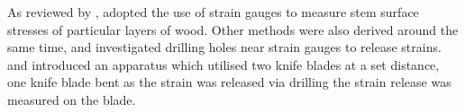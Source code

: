 As reviewed by \cite{kubler_1987}, \cite{Okuyama_1981} adopted the use of strain gauges to measure stem surface
stresses of particular layers of wood. Other methods were also derived around
the same time, \cite{gueneau1973}\cite{gueneau1973b} and \cite{kikata1977} investigated drilling holes near strain gauges to release strains.
\cite{Gueneau1974} and \cite{Saurat_1976} introduced an apparatus which utilised two knife
blades at a set distance, one knife blade bent as the strain was released via
drilling the strain release was measured on the blade. 
